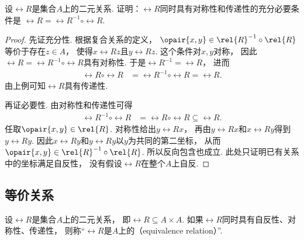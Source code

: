 \begin{example}
    设\(\rel{R}\)是集合\(A\)上的二元关系.
    证明：\(\rel{R}\)同时具有对称性和传递性的充分必要条件是
    \(\rel{R}=\rel{R}^{-1}\circ\rel{R}\).
    \begin{proof}
        先证充分性.
        根据复合关系的定义，
        \(\opair{x,y}\in\rel{R}^{-1}\circ\rel{R}\)等价于存在\(z\in A\)，
        使得\(x\rel{R}z\)且\(y\rel{R}z\).
        这个条件对\(x,y\)对称，
        因此\(\rel{R}=\rel{R}^{-1}\circ\rel{R}\)具有对称性.
        于是\(\rel{R}^{-1}=\rel{R}\)，
        进而
        \begin{align*}
            \rel{R}\circ\rel{R}
            &=\rel{R}^{-1}\circ\rel{R}=\rel{R}.
        \end{align*}
        由上例可知\(\rel{R}\)具有传递性.

        再证必要性.
        由对称性和传递性可得
        \begin{align*}
            \rel{R}^{-1}\circ\rel{R}
            &=\rel{R}\circ\rel{R}\subseteq\rel{R}.
        \end{align*}
        任取\(\opair{x,y}\in\rel{R}\).
        对称性给出\(y\rel{R}x\)，
        再由\(y\rel{R}x\)和\(x\rel{R}y\)得到\(y\rel{R}y\).
        因此\(x\rel{R}y\)和\(y\rel{R}y\)以\(y\)为共同的第二坐标，
        从而\(\opair{x,y}\in\rel{R}^{-1}\circ\rel{R}\).
        所以反向包含也成立.
        此处只证明已有关系中的坐标满足自反性，
        没有假设\(\rel{R}\)在整个\(A\)上自反.
    \end{proof}
\end{example}

\subsection{等价关系}
\begin{definition}
    设\(\rel{R}\)是集合\(A\)上的二元关系，
    即\(\rel{R}\subseteq A\times A\).
    如果\(\rel{R}\)同时具有自反性、对称性、传递性，
    则称“\(\rel{R}\)是\(A\)上的（equivalence relation）”.
\end{definition}

